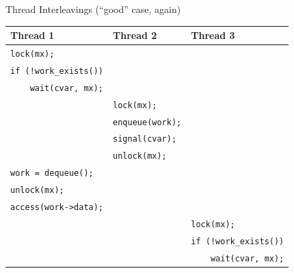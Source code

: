 \documentclass[xcolor=dvipsnames]{beamer}
\begin{document}
\begin{frame}{Thread Interleavings (``good'' case, again)}
	\begin{center}
		\begin{tabular}{|l|l|l|}
			\hline
			\cellcolor{thread1} {\bf Thread 1} & \cellcolor{thread2} {\bf Thread 2} & \cellcolor{thread3} {\bf Thread 3} \\
			\hline
			\small \texttt{lock(mx);} & & \\
			\small \texttt{if~(!work\_exists())} & & \\
			\small \texttt{~~~~wait(cvar,~mx);} & & \\
			
			& \small \texttt{lock(mx);} & \\
			& \small \texttt{enqueue(work);} & \\
			& \small \texttt{signal(cvar);} & \\
			& \small \texttt{unlock(mx);} & \\
			
			\small \texttt{work~=~dequeue();~} & & \\
			\small \texttt{unlock(mx);} & & \\
			\small \texttt{access(work->data);}& & \\
			
			& & \small \texttt{lock(mx);} \\
			& & \small \texttt{if~(!work\_exists())} \\
			& & \small \texttt{~~~~wait(cvar,~mx);} \\
			\hline
		\end{tabular}
	\end{center}
\end{frame}
\end{document}
